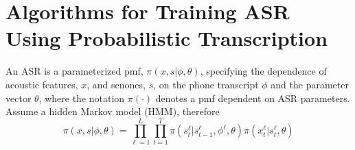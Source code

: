 \section{Algorithms for Training ASR Using Probabilistic Transcription}


An ASR is a parameterized pmf,
$\pi(x,s|\phi,\theta)$, specifying the dependence of
acoustic features, $x$, and senones, $s$, on the phone transcript
$\phi$ and the parameter vector $\theta$, where the notation
$\pi(\cdot)$ denotes a pmf dependent on ASR parameters.  
Assume a hidden Markov model (HMM), therefore
\[
\pi(x,s|\phi,\theta)=\prod_{\ell=1}^L \prod_{t=1}^T
\pi(s_t^\ell|s_{t-1}^\ell,\phi^\ell,\theta)\pi(x_t^\ell|s_t^\ell,\theta)
\]
